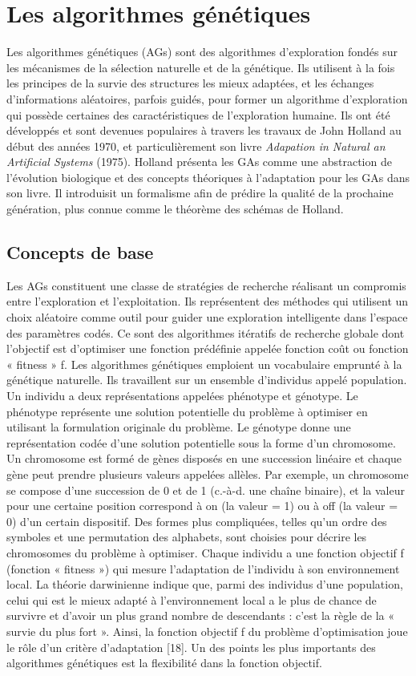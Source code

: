 \documentclass[12pt,a4paper]{article}
\begin{document}
	\section{Les algorithmes génétiques}
		
	Les algorithmes génétiques (AGs) sont des algorithmes d’exploration fondés sur les mécanismes de la sélection naturelle et de la génétique. Ils utilisent à la fois les principes de la survie des structures les mieux adaptées, et les échanges d’informations aléatoires, parfois guidés, pour former un algorithme d’exploration qui possède certaines des caractéristiques de l’exploration humaine. Ils ont été développés  et sont devenues populaires à travers les travaux de John Holland au début des années 1970, et particulièrement son livre \emph{Adapation in Natural an Artificial Systems} (1975). Holland présenta les GAs comme une abstraction de l'évolution biologique et des concepts théoriques à l'adaptation pour les GAs dans son livre. Il introduisit un formalisme afin de prédire la qualité de la prochaine génération, plus connue comme le théorème des schémas de Holland.
	
	\subsection{Concepts de base}
	Les AGs constituent une classe de stratégies de recherche réalisant un compromis entre l’exploration et l’exploitation. Ils représentent des méthodes qui utilisent
un choix aléatoire comme outil pour guider une exploration intelligente dans l’espace des paramètres codés. Ce sont des algorithmes itératifs de recherche globale dont l’objectif est d’optimiser une fonction prédéfinie appelée fonction coût ou fonction « fitness » f.
	Les algorithmes génétiques emploient un vocabulaire emprunté à la génétique naturelle. Ils travaillent sur un ensemble d’individus appelé population. Un individu a deux représentations appelées phénotype et génotype. Le phénotype représente une solution potentielle du problème à optimiser en utilisant la formulation originale du problème. Le génotype donne une représentation codée
d’une solution potentielle sous la forme d’un chromosome. Un chromosome est formé de gènes disposés en une succession linéaire et chaque gène peut prendre plusieurs
valeurs appelées allèles. Par exemple, un chromosome se compose d’une succession de 0 et de 1 (c.-à-d. une chaîne binaire), et la valeur pour une certaine position correspond à on (la valeur = 1) ou à off (la valeur = 0) d’un certain dispositif. Des formes plus compliquées, telles qu’un ordre des symboles et une permutation des alphabets, sont choisies pour décrire les chromosomes du problème à optimiser. Chaque individu a une fonction objectif f (fonction « fitness ») qui mesure l’adaptation de l’individu à son environnement local. La théorie darwinienne indique que, parmi des individus d’une population, celui qui est le mieux adapté à l’environnement local a le plus de chance de survivre et d’avoir un plus grand nombre de descendants : c’est la règle de la « survie du plus fort ». Ainsi, la
fonction objectif f du problème d’optimisation joue le rôle d’un critère d’adaptation [18]. Un des points les plus importants des algorithmes génétiques est la flexibilité dans la fonction objectif.
\end{document}
